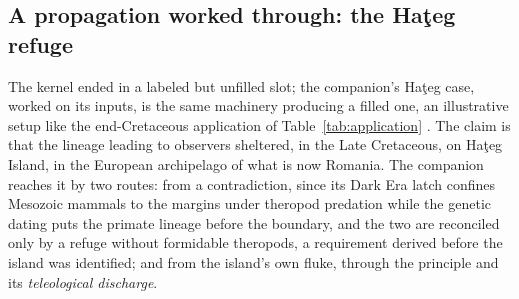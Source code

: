 \documentclass[11pt]{article}
\theoremstyle{definition}
\begin{document}
\subsection{A propagation worked through: the Ha\c{t}eg refuge}\label{sec:hateg-chain}

The kernel ended in a labeled but unfilled slot; the companion's Ha\c{t}eg case, worked on its inputs, is the same machinery producing a filled one, an illustrative setup like the end-Cretaceous application of Table~\ref{tab:application} \cite{Nexus}. The claim is that the lineage leading to observers sheltered, in the Late Cretaceous, on Ha\c{t}eg Island, in the European archipelago of what is now Romania. The companion reaches it by two routes: from a contradiction, since its Dark Era latch confines Mesozoic mammals to the margins under theropod predation while the genetic dating puts the primate lineage before the boundary, and the two are reconciled only by a refuge without formidable theropods, a requirement derived before the island was identified; and from the island's own fluke, through the principle and its \emph{teleological discharge}.
\end{document}
